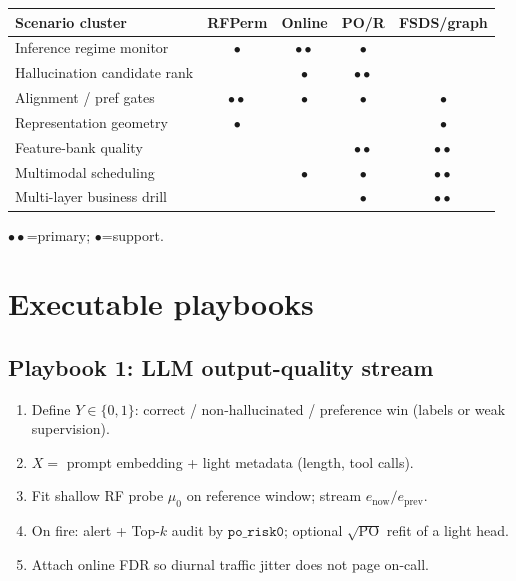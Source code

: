 \documentclass[11pt,a4paper]{article}
\begin{document}
\begin{center}
\begin{tabular}{@{}lcccc@{}}
\toprule
Scenario cluster & RFPerm & Online & PO/R & FSDS/graph \\
\midrule
Inference regime monitor & \(\bullet\) & \(\bullet\!\!\bullet\) & \(\bullet\) & \\
Hallucination candidate rank & & \(\bullet\) & \(\bullet\!\!\bullet\) & \\
Alignment / pref gates & \(\bullet\!\!\bullet\) & \(\bullet\) & \(\bullet\) & \(\bullet\) \\
Representation geometry & \(\bullet\) & & & \(\bullet\) \\
Feature-bank quality & & & \(\bullet\!\!\bullet\) & \(\bullet\!\!\bullet\) \\
Multimodal scheduling & & \(\bullet\) & \(\bullet\) & \(\bullet\!\!\bullet\) \\
Multi-layer business drill & & & \(\bullet\) & \(\bullet\!\!\bullet\) \\
\bottomrule
\end{tabular}
\end{center}
{\small \(\bullet\!\!\bullet\)=primary; \(\bullet\)=support.}

\section{Executable playbooks}
\label{sec:playbook}

\subsection{Playbook 1: LLM output-quality stream}
\begin{enumerate}
  \item Define \(Y\in\{0,1\}\): correct / non-hallucinated / preference win (labels or weak supervision).
  \item \(X=\) prompt embedding + light metadata (length, tool calls).
  \item Fit shallow RF probe \(\mu_0\) on reference window; stream \(e_{\mathrm{now}}/e_{\mathrm{prev}}\).
  \item On fire: alert + Top-\(k\) audit by \(\texttt{po\_risk0}\); optional \(\sqrt{\mathrm{PO}}\) refit of a light head.
  \item Attach online FDR so diurnal traffic jitter does not page on-call.
\end{enumerate}
\end{document}
